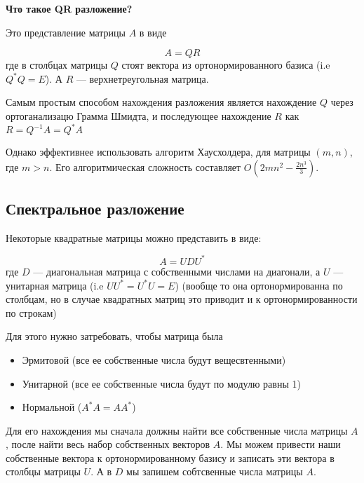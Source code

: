 \documentclass{article}
\begin{document}
    \quad 

    \textbf{Что такое QR разложение?}
    
    \quad 

    Это представление матрицы $A$ в виде 

    \begin{equation}
        A = QR 
    \end{equation}
    где в столбцах матрицы $Q$ стоят вектора из ортонормированного базиса (i.e $Q^{*}Q = E$). 
    А $R$ --- верхнетреугольная матрица. 

    \quad 

    Самым простым способом нахождения разложения является нахождение $Q$ через ортоганализацю Грамма Шмидта, и последующее нахождение 
    $R$ как $R = Q^{-1}A = Q^{*}A$

    \quad 

    Однако эффективнее использовать алгоритм Хаусхолдера, для матрицы $(m, n)$, где 
    $m > n$. Его алгоритмическая сложность составляет $O(2mn^{2} - \frac{2 n^{3}}{3})$.

    \subsection{Спектральное разложение}

    Некоторые квадратные матрицы можно представить в виде: 

    \begin{equation}
        A = U D U^{*}
    \end{equation}
    где $D$ --- диагональная матрица с собственными числами на диагонали, а $U$ --- унитарная матрица (i.e $UU^{*} = U^{*}U = E$) 
    (вообще то она ортонормированна по столбцам, но в случае квадратных матриц это приводит и к ортонормированности по строкам)

    Для этого нужно затребовать, чтобы матрица была 

    \begin{itemize}
        \item Эрмитовой (все ее собственные числа будут вещесвтенными)
        \item Унитарной (все ее собственные числа будут по модулю равны 1)
        \item Нормальной ($A^{*}A = A A^{*}$)
    \end{itemize}

    Для его нахождения мы сначала должны найти все собственные числа матрицы $A$, после найти весь набор 
    собственных векторов $A$. Мы можем привести наши собственные вектора к ортонормированному базису и записать 
    эти вектора в столбцы матрицы $U$. А в $D$ мы запишем собтсвенные числа матрицы $A$.
\end{document}
